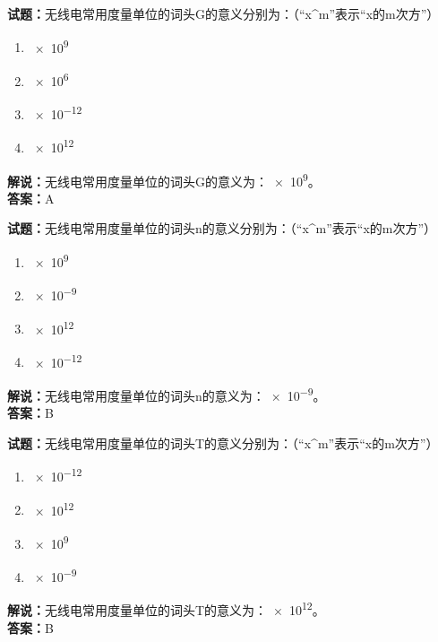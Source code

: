 \documentclass{ctexbook}
\begin{document}
\vspace{\baselineskip}

\noindent\textbf{试题：}无线电常用度量单位的词头G的意义分别为：（“x\string^m”表示“x的m次方”）

\begin{enumerate}[leftmargin=3em]
  \item \num{e9}%
  \item \num{e6}%
  \item \num{e-12}%
  \item \num{e12}%
\end{enumerate}

\noindent\textbf{解说：}无线电常用度量单位的词头G的意义为：\num{e9}。\\
\noindent\textbf{答案：}A

\vspace{\baselineskip}

\noindent\textbf{试题：}无线电常用度量单位的词头n的意义分别为：（“x\string^m”表示“x的m次方”）

\begin{enumerate}[leftmargin=3em]
  \item \num{e9}%
  \item \num{e-9}%
  \item \num{e12}%
  \item \num{e-12}%
\end{enumerate}

\noindent\textbf{解说：}无线电常用度量单位的词头n的意义为：\num{e-9}。\\
\noindent\textbf{答案：}B

\vspace{\baselineskip}

\noindent\textbf{试题：}无线电常用度量单位的词头T的意义分别为：（“x\string^m”表示“x的m次方”）

\begin{enumerate}[leftmargin=3em]
  \item \num{e-12}%
  \item \num{e12}%
  \item \num{e9}%
  \item \num{e-9}%
\end{enumerate}

\noindent\textbf{解说：}无线电常用度量单位的词头T的意义为：\num{e12}。\\
\noindent\textbf{答案：}B
\end{document}
